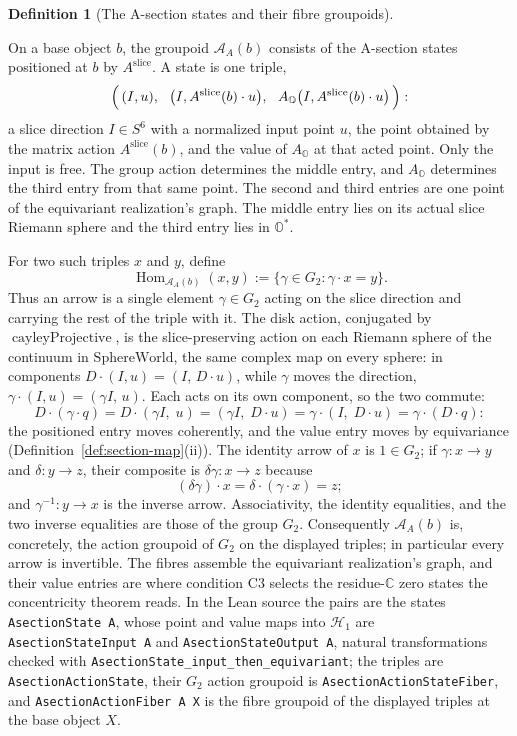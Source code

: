 \documentclass[11pt]{article}
\newcommand{\OO}{\mathbb{O}}
\newcommand{\CC}{\mathbb{C}}
\providecommand{\SphereWorld}{\mathrm{SphereWorld}}
\providecommand{\lean}[1]{}
\providecommand{\uses}[1]{}
\theoremstyle{plain}
\theoremstyle{definition}
\newtheorem{definition}[theorem]{Definition}
\theoremstyle{remark}
\begin{document}
\begin{definition}[The A-section states and their fibre groupoids]\label{def:states}
\lean{ASection.AsectionState, ASection.AsectionStateInput,
ASection.AsectionStateOutput,
ASection.AsectionState_input_then_equivariant,
ASection.AsectionActionState}
\uses{prop:aslice-functor, def:section-map}
On a base object $b$, the groupoid $\mathcal A_A(b)$ consists of the
A-section states positioned at $b$ by $A^{\mathrm{slice}}$. A state is
one triple,
\[
  \Bigl(\,(I,u),\ \
  \bigl(I,A^{\mathrm{slice}}(b)\cdot u\bigr),\ \
  A_{\OO}\bigl(I,A^{\mathrm{slice}}(b)\cdot u\bigr)\,\Bigr):
\]
a slice direction $I\in S^6$ with a normalized input point $u$, the point
obtained by the matrix action $A^{\mathrm{slice}}(b)$, and the value of
$A_{\OO}$ at that acted point. Only the input is free. The group action
determines the middle entry, and $A_{\OO}$ determines the third entry from
that same point. The second and third entries are one point of the
equivariant realization's graph. The middle entry lies on its actual slice
Riemann sphere and the third entry lies in $\OO^{*}$.

For two such triples $x$ and $y$, define
\[
 \operatorname{Hom}_{\mathcal A_A(b)}(x,y)
 :=\{\gamma\in G_2:\gamma\cdot x=y\}.
\]
Thus an arrow is a single element $\gamma\in G_2$ acting on the slice
direction and carrying the rest of the triple with it. The disk action,
conjugated by $\operatorname{cayleyProjective}$, is the slice-preserving
action on each Riemann sphere of the continuum in $\SphereWorld$, the same
complex map on every sphere: in components $D\cdot(I,u)=(I,\,D\cdot u)$,
while $\gamma$ moves the direction, $\gamma\cdot(I,u)=(\gamma I,\,u)$. Each
acts on its own component, so the two commute:
\[
  D\cdot(\gamma\cdot q)=D\cdot(\gamma I,\;u)=(\gamma I,\;D\cdot u)
    =\gamma\cdot(I,\;D\cdot u)=\gamma\cdot(D\cdot q):
\]
the positioned entry moves coherently, and the value entry moves by
equivariance (Definition~\ref{def:section-map}(ii)).  The identity arrow of
$x$ is $1\in G_2$; if $\gamma:x\to y$ and $\delta:y\to z$, their composite
is $\delta\gamma:x\to z$ because
\[
 (\delta\gamma)\cdot x=\delta\cdot(\gamma\cdot x)=z;
\]
and $\gamma^{-1}:y\to x$ is the inverse arrow.  Associativity, the identity
equalities, and the two inverse equalities are those of the group $G_2$.
Consequently $\mathcal A_A(b)$ is, concretely, the action groupoid of $G_2$
on the displayed triples; in particular every arrow is invertible. The fibres assemble the
equivariant realization's graph, and their value entries are where condition
\textup{C3} selects the residue-$\CC$ zero states the concentricity theorem
reads. In the Lean source the pairs are the states \texttt{AsectionState\,A},
whose point and value maps into $\mathcal H_1$ are
\texttt{AsectionStateInput\,A} and \texttt{AsectionStateOutput\,A}, natural
transformations checked with \texttt{AsectionState\_input\_then\_equivariant};
the triples are \texttt{AsectionActionState}, their $G_2$ action groupoid is
\texttt{AsectionActionStateFiber}, and
\texttt{AsectionActionFiber\,A\,X} is the fibre groupoid of the displayed
triples at the base object $X$.
\end{definition}
\end{document}
